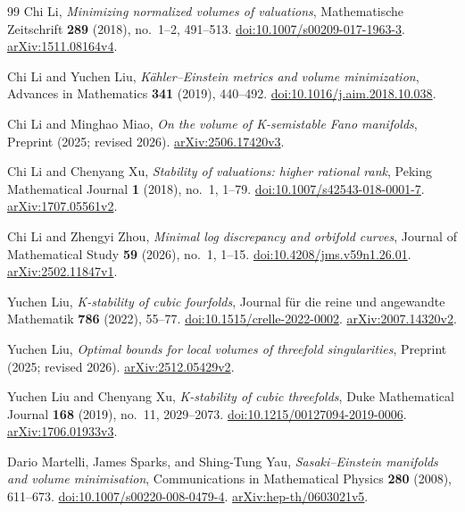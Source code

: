 \documentclass[11pt]{article}
\theoremstyle{definition}
\theoremstyle{remark}
\numberwithin{equation}{section}
\begin{document}
\begin{thebibliography}{99}
Chi Li,
\emph{Minimizing normalized volumes of valuations},
Mathematische Zeitschrift \textbf{289} (2018), no.~1--2, 491--513.
\href{https://doi.org/10.1007/s00209-017-1963-3}{doi:10.1007/s00209-017-1963-3}.
\href{https://arxiv.org/abs/1511.08164v4}{arXiv:1511.08164v4}.

Chi Li and Yuchen Liu,
\emph{K\"ahler--Einstein metrics and volume minimization},
Advances in Mathematics \textbf{341} (2019), 440--492.
\href{https://doi.org/10.1016/j.aim.2018.10.038}{doi:10.1016/j.aim.2018.10.038}.

Chi Li and Minghao Miao,
\emph{On the volume of K-semistable Fano manifolds},
Preprint (2025; revised 2026).
\href{https://arxiv.org/abs/2506.17420v3}{arXiv:2506.17420v3}.


Chi Li and Chenyang Xu,
\emph{Stability of valuations: higher rational rank},
Peking Mathematical Journal \textbf{1} (2018), no.~1, 1--79.
\href{https://doi.org/10.1007/s42543-018-0001-7}{doi:10.1007/s42543-018-0001-7}.
\href{https://arxiv.org/abs/1707.05561v2}{arXiv:1707.05561v2}.

Chi Li and Zhengyi Zhou,
\emph{Minimal log discrepancy and orbifold curves},
Journal of Mathematical Study \textbf{59} (2026), no.~1, 1--15.
\href{https://doi.org/10.4208/jms.v59n1.26.01}{doi:10.4208/jms.v59n1.26.01}.
\href{https://arxiv.org/abs/2502.11847v1}{arXiv:2502.11847v1}.

Yuchen Liu,
\emph{K-stability of cubic fourfolds},
Journal f\"ur die reine und angewandte Mathematik \textbf{786} (2022), 55--77.
\href{https://doi.org/10.1515/crelle-2022-0002}{doi:10.1515/crelle-2022-0002}.
\href{https://arxiv.org/abs/2007.14320v2}{arXiv:2007.14320v2}.

Yuchen Liu,
\emph{Optimal bounds for local volumes of threefold singularities},
Preprint (2025; revised 2026).
\href{https://arxiv.org/abs/2512.05429v2}{arXiv:2512.05429v2}.

Yuchen Liu and Chenyang Xu,
\emph{K-stability of cubic threefolds},
Duke Mathematical Journal \textbf{168} (2019), no.~11, 2029--2073.
\href{https://doi.org/10.1215/00127094-2019-0006}{doi:10.1215/00127094-2019-0006}.
\href{https://arxiv.org/abs/1706.01933v3}{arXiv:1706.01933v3}.

Dario Martelli, James Sparks, and Shing-Tung Yau,
\emph{Sasaki--Einstein manifolds and volume minimisation},
Communications in Mathematical Physics \textbf{280} (2008), 611--673.
\href{https://doi.org/10.1007/s00220-008-0479-4}{doi:10.1007/s00220-008-0479-4}.
\href{https://arxiv.org/abs/hep-th/0603021v5}{arXiv:hep-th/0603021v5}.


\end{thebibliography}
\end{document}
